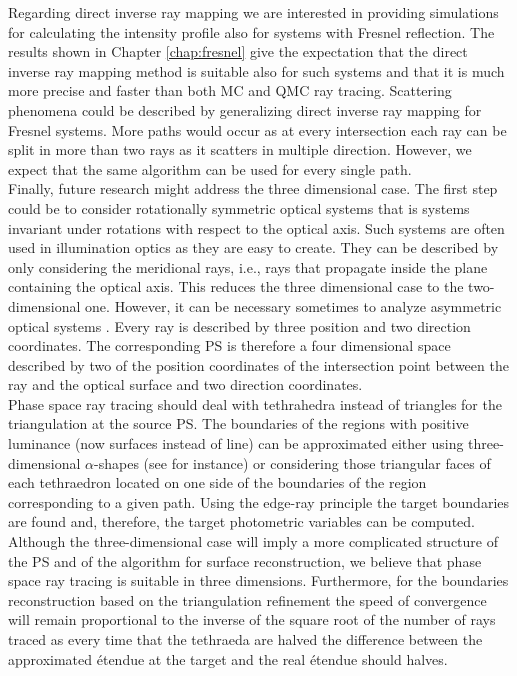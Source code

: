 Regarding direct inverse ray mapping we are interested in providing simulations for calculating the intensity profile also for systems with Fresnel reflection. The results shown in Chapter \ref{chap:fresnel} give the expectation that the direct inverse ray mapping method is suitable also for such systems and that it is much more precise and faster than both MC and QMC ray tracing. Scattering phenomena could be described by generalizing direct inverse ray mapping for Fresnel systems. More paths would occur as at every intersection each ray can be split in more than two rays as it scatters in multiple direction. However, we expect that the same algorithm can be used for every single path.
 \\ \indent 
Finally, future research might address the three dimensional case. The first step could be to consider rotationally symmetric optical systems that is systems invariant under rotations with respect to the optical axis. Such systems are often used in illumination optics as they are easy to create. They can be described by only considering the meridional rays, i.e., rays that propagate inside the plane containing the optical axis. This reduces the three dimensional case to the two-dimensional one. However, it can be necessary sometimes to analyze asymmetric optical systems \cite{ries1997performance}. Every ray is described by three position and two direction coordinates. The corresponding PS is therefore a four dimensional space described by two of the position coordinates of the intersection point between the ray and the optical surface and two direction coordinates. \\ \indent Phase space ray tracing should deal with tethrahedra instead of triangles for the triangulation at the source PS. The boundaries of the regions with positive luminance (now surfaces instead of line) can be approximated either using three-dimensional $\alpha$-shapes (see for instance\cite{cazals2005conformal, teichmann1998surface}) or considering those triangular faces of each tethraedron located on one side of the boundaries of the region corresponding to a given path. Using the edge-ray principle the target boundaries are found and, therefore, the target photometric variables can be computed. Although the three-dimensional case will imply a more complicated structure of the PS and of the algorithm for surface reconstruction, we believe that phase space ray tracing is suitable in three dimensions. 
Furthermore, for the boundaries reconstruction based on the triangulation refinement the speed of convergence will remain proportional to the inverse of the square root of the number of rays traced as every time that the tethraeda are halved the difference between the approximated \'{e}tendue at the target and the real \'{e}tendue should halves.
